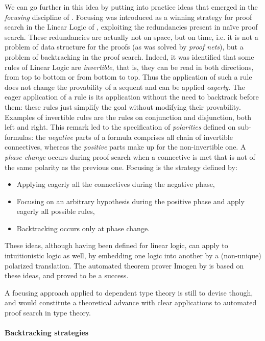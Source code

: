 \documentclass[twoside,a4paper,12pt]{article}
\begin{document}
We can go further in this idea by putting into practice ideas that
emerged in the \emph{focusing} discipline of \cite{andreoli1992logic}.
Focusing was introduced as a winning strategy for proof search in the
Linear Logic of \cite{girard1995linear}, exploiting the redundancies
present in na\"ive proof search. These redundancies are actually not
on space, but on time, i.e. it is not a problem of data structure for
the proofs (as was solved by \emph{proof nets}), but a problem of
backtracking in the proof search. Indeed, it was identified that some
rules of Linear Logic are \emph{invertible}, that is, they can be read
in both directions, from top to bottom or from bottom to top. Thus the
application of such a rule does not change the provability of a
sequent and can be applied \emph{eagerly}. The eager application of a
rule is its application without the need to backtrack before them:
these rules just simplify the goal without modifying their
provability. Examples of invertible rules are the rules on conjunction
and disjunction, both left and right. This remark led to the
specification of \emph{polarities} defined on sub-formulas: the
\emph{negative} parts of a formula comprises all chain of invertible
connectives, whereas the \emph{positive} parts make up for the
non-invertible one. A \emph{phase change} occurs during proof search
when a connective is met that is not of the same polarity as the
previous one. Focusing is the strategy defined by:
\begin{itemize}
\item Applying eagerly all the connectives during the negative phase,
\item Focusing on an arbitrary hypothesis during the positive phase
  and apply eagerly all possible rules,
\item Backtracking occurs only at phase change.
\end{itemize}

These ideas, although having been defined for linear logic, can apply
to intuitionistic logic as well, by embedding one logic into another
by a (non-unique) polarized translation. The automated theorem prover
\textsf{Imogen} by \cite{mclaughlin2009efficient} is based on these
ideas, and proved to be a success.

A focusing approach applied to dependent type theory is still to
devise though, and would constitute a theoretical advance with clear
applications to automated proof search in type theory.

\paragraph{Backtracking strategies}
\end{document}
